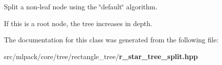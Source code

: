 Split a non-\/leaf node using the \char`\"{}default\char`\"{} algorithm. 

If this is a root node, the tree increases in depth. 

The documentation for this class was generated from the following file\+:\begin{DoxyCompactItemize}
\item 
src/mlpack/core/tree/rectangle\+\_\+tree/{\bf r\+\_\+star\+\_\+tree\+\_\+split.\+hpp}\end{DoxyCompactItemize}
